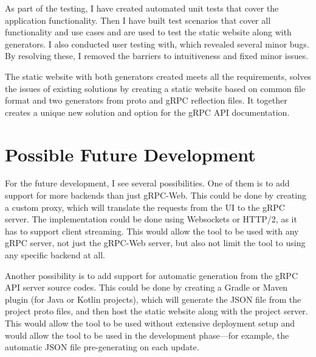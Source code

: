As part of the testing, I have created automated unit tests that cover the application functionality.
Then I have built test scenarios that cover all functionality and use cases and are used to test the static website along with generators.
I also conducted user testing with, which revealed several minor bugs.
By resolving these, I removed the barriers to intuitiveness and fixed minor issues.

The static website with both generators created meets all the requirements, solves the issues of existing solutions by creating a static website based on common file format and two generators from proto and gRPC reflection files.
It together creates a unique new solution and option for the gRPC API documentation.


\section{Possible Future Development}
For the future development, I see several possibilities.
One of them is to add support for more backends than just gRPC-Web.
This could be done by creating a custom proxy, which will translate the requests from the UI to the gRPC server.
The implementation could be done using Websockets or HTTP/2, as it has to support client streaming.
This would allow the tool to be used with any gRPC server, not just the gRPC-Web server, but also not limit the tool to using any specific backend at all.

Another possibility is to add support for automatic generation from the gRPC API server source codes.
This could be done by creating a Gradle or Maven plugin (for Java or Kotlin projects), which will generate the JSON file from the project proto files, and then host the static website along with the project server.
This would allow the tool to be used without extensive deployment setup and would allow the tool to be used in the development phase—for example, the automatic JSON file pre-generating on each update.